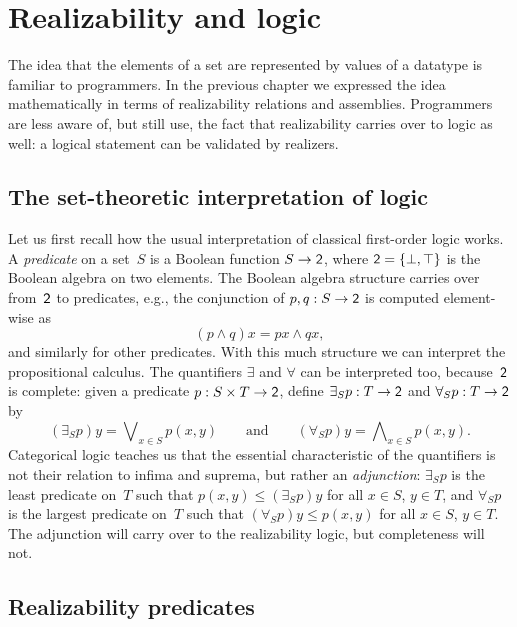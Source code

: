 \chapter{Realizability and logic}
\label{cha:realizability-logic}

The idea that the elements of a set are represented by values of a datatype is familiar to programmers. In the previous chapter we expressed the idea mathematically in terms of realizability relations and assemblies. Programmers are less aware of, but still use, the fact that realizability carries over to logic as well: a logical statement can be validated by realizers.

\section{The set-theoretic interpretation of logic}
\label{sec:interpr-logic-set-theoretic}

Let us first recall how the usual interpretation of classical
first-order logic works.
%
A \emph{predicate} on a set~$S$ is a Boolean function $S \to \mathsf{2}$, where $\mathsf{2} = \{\bot, \top\}$ is the Boolean algebra on two elements. The Boolean algebra structure carries over from~$\mathsf{2}$ to predicates, e.g., the conjunction of $p, q : S \to \mathsf{2}$ is computed element-wise as
%
\begin{equation*}
  (p \land q) x = p x \land q x,
\end{equation*}
%
and similarly for other predicates. With this much structure we can interpret the propositional calculus. The quantifiers $\exists$ and $\forall$ can be interpreted too, because~$\mathsf{2}$ is complete: given a predicate $p : S \times T \to \mathsf{2}$, define $\exists_S p : T \to \mathsf{2}$ and $\forall_S p : T \to \mathsf{2}$ by
%
\begin{equation*}
  (\exists_S p) y = \bigvee\nolimits_{x \in S} p(x, y)
  \qquad\text{and}\qquad
  (\forall_S p) y = \bigwedge\nolimits_{x \in S} p(x, y).
\end{equation*}
%
Categorical logic teaches us that the essential characteristic of the quantifiers is not their relation to infima and suprema, but rather an \emph{adjunction}: $\exists_S p$ is the least predicate on~$T$ such that $p(x, y) \leq (\exists_S p) y$ for all $x \in S$, $y \in T$, and $\forall_S p$ is the largest predicate on~$T$ such that $(\forall_S p) y \leq p(x, y)$ for all $x \in S$, $y \in T$. The adjunction will carry over to the realizability logic, but completeness will not.


\section{Realizability predicates}
\label{sec:realizability-predicates}

